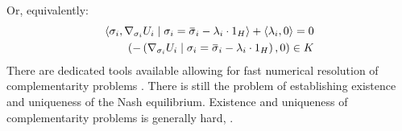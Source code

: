 Or, equivalently:
\begin{equation}
  \begin{split}
    \ip{\sigma_i}{\nabla_{\sigma_i} U_i \mid{\sigma_i = \overbar{\sigma}_i} - \lambda_i \cdot 1_H} + \ip{\lambda_i}{0}= 0 \\
    \pa{-\pa{\nabla_{\sigma_i} U_i \mid{\sigma_i = \overbar{\sigma}_i} - \lambda_i \cdot 1_H}, 0} \in K
  \end{split}
\end{equation}
There are dedicated tools available allowing for fast numerical resolution of complementarity problems \citep{acary2019introduction, dirkse1995path}. There is still the problem of establishing existence and uniqueness of the Nash equilibrium. Existence and uniqueness of complementarity problems is generally hard, \citep{hadjisavvas2006handbook}.




